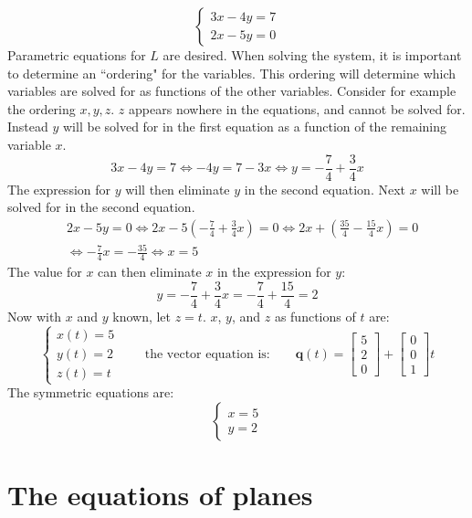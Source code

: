 \documentclass{article}
\begin{document}
\begin{itemize}
\[\left\{\begin{array}{c}
3x - 4y = 7 \\ 
2x - 5y = 0
\end{array}\right.\]
Parametric equations for \(L\) are desired. When solving the system, it is important to determine an ``ordering" for the variables. This ordering will determine which variables are solved for as functions of the other variables. Consider for example the ordering \(x, y, z\). \(z\) appears nowhere in the equations, and cannot be solved for. Instead \(y\) will be solved for in the first equation as a function of the remaining variable \(x\). 
\[3x - 4y = 7 \iff -4y = 7 - 3x \iff y = -\frac{7}{4} + \frac{3}{4}x\]
The expression for \(y\) will then eliminate \(y\) in the second equation. Next \(x\) will be solved for in the second equation.
\begin{align*}
& 2x - 5y = 0 \iff 2x - 5(-\frac{7}{4} + \frac{3}{4}x) = 0 \iff 2x + (\frac{35}{4} - \frac{15}{4}x) = 0 \\
& \iff -\frac{7}{4}x = -\frac{35}{4} \iff x = 5
\end{align*}
The value for \(x\) can then eliminate \(x\) in the expression for \(y\):
\[y = -\frac{7}{4} + \frac{3}{4}x = -\frac{7}{4} + \frac{15}{4} = 2\]
Now with \(x\) and \(y\) known, let \(z = t\). \(x\), \(y\), and \(z\) as functions of \(t\) are:
\[\left\{\begin{array}{c}
x(t) = 5 \\ 
y(t) = 2 \\ 
z(t) = t
\end{array}\right.
\quad\quad\text{the vector equation is:}\quad\quad
\mathbf{q}(t) = \begin{bmatrix} 5 \\ 2 \\ 0 \end{bmatrix} + \begin{bmatrix} 0 \\ 0 \\ 1 \end{bmatrix}t\]
The symmetric equations are:
\[\left\{\begin{array}{c}
x = 5 \\
y = 2 \end{array}\right.\]
\end{itemize}






\section*{The equations of planes}
\end{document}
